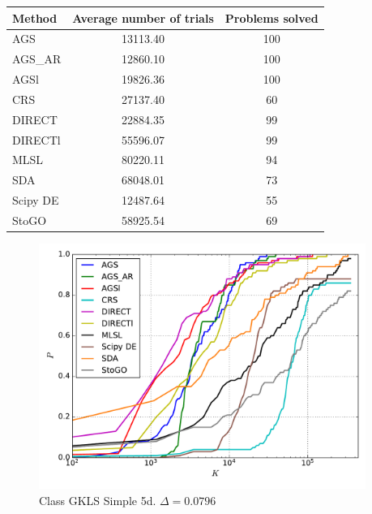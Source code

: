 \documentclass[a4paper]{article}
\begin{document}
\begin{tabular}{lcc}
\hline
 Method   &  Average number of trials  &  Problems solved  \\
\hline
 AGS      &          13113.40          &        100        \\
 AGS\_AR   &          12860.10          &        100        \\
 AGSl     &          19826.36          &        100        \\
 CRS      &          27137.40          &        60         \\
 DIRECT   &          22884.35          &        99         \\
 DIRECTl  &          55596.07          &        99         \\
 MLSL     &          80220.11          &        94         \\
 SDA      &          68048.01          &        73         \\
 Scipy DE &          12487.64          &        55         \\
 StoGO    &          58925.54          &        69         \\
\hline
\end{tabular}
\begin{figure}[H]
  \center
  \includegraphics[width=0.95\textwidth]{../experiments/gklss5d_serg/cmc.pdf}
  \caption{Class GKLS Simple 5d. $\Delta=0.0796$}

\end{figure}
\end{document}
